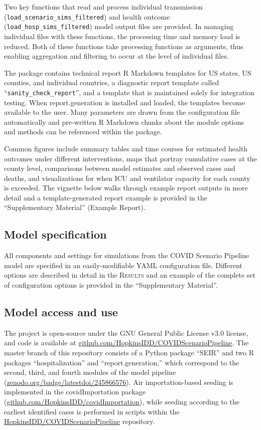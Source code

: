 {Two key functions that read and process individual transmission (\verb|load_scenario_sims_filtered|) and health outcome (\verb|load_hosp_sims_filtered|) model output files are provided. In managing individual files with these functions, the processing time and memory load is reduced. Both of these functions take processing functions as arguments, thus enabling aggregation and filtering to occur at the level of individual files.

The package contains technical report R Markdown templates for US states, US counties, and individual countries, a diagnostic report template called “\verb|sanity_check_report|”, and a template that is maintained solely for integration testing. When report.generation is installed and loaded, the templates become available to the user. Many parameters are drawn from the configuration file automatically and pre-written R Markdown chunks about the module options and methods can be referenced within the package.

Common figures include summary tables and time courses for estimated health outcomes under different interventions, maps that portray cumulative cases at the county level, comparisons between model estimates and observed cases and deaths, and visualizations for when ICU and ventilator capacity for each county is exceeded. The vignette below walks through example report outputs in more detail and a template-generated report example is provided in the “Supplementary Material” (Example Report).

\subsection{Model specification}
All components and settings for simulations from the COVID Scenario Pipeline model are specified in an easily-modifiable YAML configuration file. Different options are described in detail in the \textsc{Results} and an example of the complete set of configuration options is provided in the “Supplementary Material”.

\subsection{Model access and use}
The project is open-source under the GNU General Public License v3.0 license, and code is available at \url{github.com/HopkinsIDD/COVIDScenarioPipeline}. The master branch of this repository consists of a Python package “SEIR” and two R packages “hospitalization” and “report.generation,” which correspond to the second, third, and fourth modules of the model pipeline (\url{zenodo.org/badge/latestdoi/245866576}). Air importation-based seeding is implemented in the covidImportation package (\url{github.com/HopkinsIDD/covidImportation}), while seeding according to the earliest identified cases is performed in scripts within the \url{HopkinsIDD/COVIDScenarioPipeline} repository.

}
